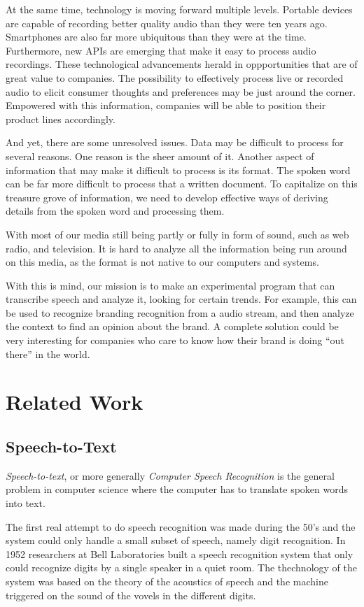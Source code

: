 \documentclass[a4paper,12pt,twoside]{ltxdoc}
\begin{document}
At the same time, technology is moving forward multiple levels. Portable devices are capable of recording better quality
audio than they were ten years ago. Smartphones are also far more ubiquitous than they were at the time.
Furthermore, new APIs are emerging that make it easy to process audio recordings. These technological advancements herald
in oppportunities that are of great value to companies. The possibility to effectively process live or recorded audio
to elicit consumer thoughts and preferences may be just around the corner. Empowered with this information, companies will
be able to position their product lines accordingly.

And yet, there are some unresolved issues. Data may be difficult to process for several reasons. One reason is the sheer
amount of it. Another aspect of information that may make it difficult to process is its format. The spoken word can be 
far more difficult to process that a written document. To capitalize on this treasure grove of information, we need
to develop effective ways of deriving details from the spoken word and processing them.

With most of our media still being partly or fully in form of sound, such  as web radio, and television.
It is hard to analyze all the information being run around on this media, as the format is not
native to our computers and systems. 

With this is mind, our mission is to make an experimental program that can transcribe speech and analyze it, looking for certain trends.
For example, this can be used to recognize branding recognition from a audio stream, and then analyze the context to find an opinion about the brand.
A complete solution could be very interesting for companies who care to know how their brand is doing ``out there'' in the world.

\section{Related Work}
\subsection{Speech-to-Text}
\emph{Speech-to-text}, or more generally \emph{Computer Speech Recognition} is the general problem in computer science where the computer has to translate spoken words into text.

The first real attempt to do speech recognition was made during the 50's and the system could only handle a small subset of speech, namely digit recognition. In 1952 researchers at Bell Laboratories built a speech recognition system that only could recognize digits by a single speaker in a quiet room. The thechnology of  the system was based on the theory of the acoustics of speech and the machine triggered on the sound of the vovels in the different digits.
\end{document}
